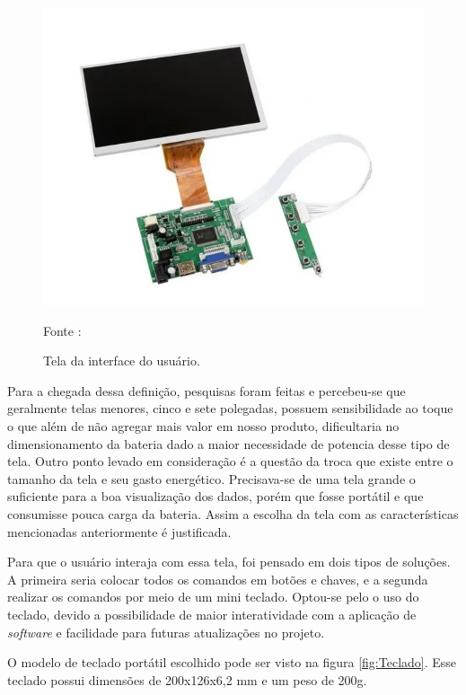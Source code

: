 \begin{figure}[H]
  \centering
  \includegraphics[scale=0.6]{figuras/TELAPI2.png}
  \caption{Tela da interface do usuário. }
  {\footnotesize Fonte : \cite{figura_Tela} } 
  \label{fig:Tela}
\end{figure}

\par Para a chegada dessa definição, pesquisas foram feitas e percebeu-se que geralmente telas menores, cinco e sete polegadas, possuem sensibilidade ao toque o que além de não agregar mais valor em nosso produto, dificultaria no dimensionamento da bateria dado a maior necessidade de potencia desse tipo de tela. Outro ponto levado em consideração é a questão da troca que existe entre o tamanho da tela e seu gasto energético. Precisava-se de uma tela grande o suficiente para a boa visualização dos dados, porém que fosse portátil e que consumisse pouca carga da bateria. Assim a escolha da tela com as características mencionadas anteriormente é justificada.

\par Para que o usuário interaja com essa tela, foi pensado em dois tipos de soluções. A primeira seria colocar todos os comandos em botões e chaves, e a segunda realizar os comandos por meio de um mini teclado. Optou-se pelo o uso do teclado, devido a possibilidade de maior interatividade com a aplicação de \textit{software} e facilidade para futuras atualizações no projeto. 

\par O modelo de teclado portátil escolhido pode ser visto na figura  \ref{fig:Teclado}. Esse teclado possui dimensões de 200x126x6,2 mm e um peso de 200g.





